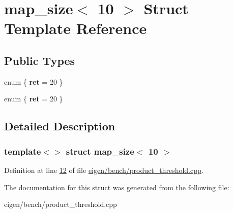\hypertarget{structmap__size_3_0110_01_4}{}\section{map\+\_\+size$<$ 10 $>$ Struct Template Reference}
\label{structmap__size_3_0110_01_4}
\subsection*{Public Types}
\begin{DoxyCompactItemize}
\item 
\mbox{\label{structmap__size_3_0110_01_4_a66e72690caf48c6fc5cf03c332b83421}} 
enum \{ {\bfseries ret} = 20
 \}
\item 
\mbox{\label{structmap__size_3_0110_01_4_a9d6a48a50602087ec41ae3cdbf2faeea}} 
enum \{ {\bfseries ret} = 20
 \}
\end{DoxyCompactItemize}


\subsection{Detailed Description}
\subsubsection*{template$<$$>$\newline
struct map\+\_\+size$<$ 10 $>$}



Definition at line \hyperlink{eigen_2bench_2product__threshold_8cpp_source_l00012}{12} of file \hyperlink{eigen_2bench_2product__threshold_8cpp_source}{eigen/bench/product\+\_\+threshold.\+cpp}.



The documentation for this struct was generated from the following file\+:\begin{DoxyCompactItemize}
\item 
eigen/bench/product\+\_\+threshold.\+cpp\end{DoxyCompactItemize}
